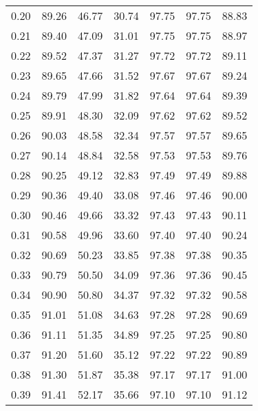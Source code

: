 \begin{tabular}{|c|c|c|c|c|c|c|}
      0.20 &     89.26 &     46.77 &      30.74 &   97.75 &      97.75 &         88.83 \\
      0.21 &     89.40 &     47.09 &      31.01 &   97.75 &      97.75 &         88.97 \\
      0.22 &     89.52 &     47.37 &      31.27 &   97.72 &      97.72 &         89.11 \\
      0.23 &     89.65 &     47.66 &      31.52 &   97.67 &      97.67 &         89.24 \\
      0.24 &     89.79 &     47.99 &      31.82 &   97.64 &      97.64 &         89.39 \\
      0.25 &     89.91 &     48.30 &      32.09 &   97.62 &      97.62 &         89.52 \\
      0.26 &     90.03 &     48.58 &      32.34 &   97.57 &      97.57 &         89.65 \\
      0.27 &     90.14 &     48.84 &      32.58 &   97.53 &      97.53 &         89.76 \\
      0.28 &     90.25 &     49.12 &      32.83 &   97.49 &      97.49 &         89.88 \\
      0.29 &     90.36 &     49.40 &      33.08 &   97.46 &      97.46 &         90.00 \\
      0.30 &     90.46 &     49.66 &      33.32 &   97.43 &      97.43 &         90.11 \\
      0.31 &     90.58 &     49.96 &      33.60 &   97.40 &      97.40 &         90.24 \\
      0.32 &     90.69 &     50.23 &      33.85 &   97.38 &      97.38 &         90.35 \\
      0.33 &     90.79 &     50.50 &      34.09 &   97.36 &      97.36 &         90.45 \\
      0.34 &     90.90 &     50.80 &      34.37 &   97.32 &      97.32 &         90.58 \\
      0.35 &     91.01 &     51.08 &      34.63 &   97.28 &      97.28 &         90.69 \\
      0.36 &     91.11 &     51.35 &      34.89 &   97.25 &      97.25 &         90.80 \\
      0.37 &     91.20 &     51.60 &      35.12 &   97.22 &      97.22 &         90.89 \\
      0.38 &     91.30 &     51.87 &      35.38 &   97.17 &      97.17 &         91.00 \\
      0.39 &     91.41 &     52.17 &      35.66 &   97.10 &      97.10 &         91.12 \\

\end{tabular}
